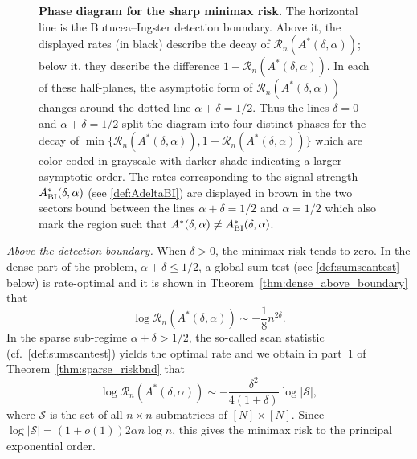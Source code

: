 \documentclass[11pt,reqno,letterpaper]{amsart}
\numberwithin{equation}{section}
\theoremstyle{plain}
\begin{document}
\begin{figure}[t]
\begin{center}
{%
}
\end{center}
\caption{{\bf Phase diagram for the sharp minimax risk.} The horizontal line is the Butucea--Ingster detection boundary. Above it, the displayed rates (in black) describe the decay of $\mathcal R_n(A^\ast(\delta, \alpha))$; below it, they describe the difference $1-\mathcal R_n(A^\ast(\delta, \alpha))$. In each of these half-planes, the asymptotic form of 
$\mathcal R_n(A^\ast(\delta, \alpha))$ changes around the dotted line $\alpha+\delta=1/2$. 
Thus the lines $\delta = 0$ and $\alpha + \delta = 1/2$ split the diagram into four distinct phases for the decay of $\min\{\mathcal R_n(A^\ast(\delta, \alpha)), 1 - \mathcal R_n(A^\ast(\delta, \alpha))\}$ which are color coded in grayscale with darker shade indicating a larger asymptotic order. The rates corresponding to the signal strength $A_{{\rm BI}}^\ast(\delta, \alpha)$ (see \eqref{def:AdeltaBI}) are displayed in {\color{darkbrown}brown} in the two sectors bound between the lines $\alpha + \delta = 1/2$ and $\alpha = 1/2$ which also mark the region such that $A^\ast(\delta, \alpha) \ne A_{{\rm BI}}^\ast(\delta, \alpha)$.}
\label{fig:phase_diagram}
\end{figure}

\smallskip

\noindent\emph{Above the detection boundary.}
When $\delta>0$, the minimax risk tends to zero. In the dense part of the problem, $\alpha + \delta \le1/2$, a global sum test (see \eqref{def:sumscantest} below) is rate-optimal and it is shown in Theorem~\ref{thm:dense_above_boundary} that
\begin{equation}\label{eq:densesupheu}
\log\mathcal R_n(A^\ast(\delta, \alpha))\sim -\frac18 n^{2\delta}.    
\end{equation}
In the sparse sub-regime $\alpha+\delta > 1/2$, the so-called scan statistic (cf.~\eqref{def:sumscantest}) yields the optimal rate and we obtain in part~1 of Theorem~\ref{thm:sparse_riskbnd} that
\begin{equation}\label{eq:sparsesupheu}
\log\mathcal R_n(A^\ast(\delta, \alpha)) \sim -\frac{\delta^2}{4(1+\delta)} \log |\mathcal S|,
\end{equation}
where $\mathcal S$ is the set of all $n\times n$ submatrices of $[N]\times[N]$. Since $\log|\mathcal S|=(1+o(1))2\alpha n\log n$, this gives the minimax risk to the principal exponential order.
\end{document}
